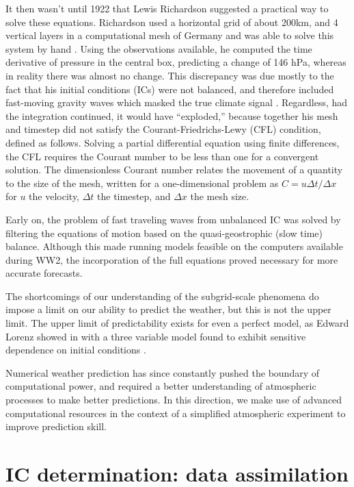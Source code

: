 It then wasn't until 1922 that Lewis Richardson suggested a practical way to solve these equations.
Richardson used a horizontal grid of about 200km, and 4 vertical layers in a computational mesh of Germany and was able to solve this system by hand .
Using the observations available, he computed the time derivative of pressure in the central box, predicting a change of 146 hPa, whereas in reality there was almost no change.
This discrepancy was due mostly to the fact that his initial conditions (ICs) were not balanced, and therefore included fast-moving gravity waves which masked the true climate signal .
Regardless, had the integration continued, it would have ``exploded,'' because together his mesh and timestep did not satisfy the Courant-Friedrichs-Lewy (CFL) condition, defined as follows.
Solving a partial differential equation using finite differences, the CFL requires the Courant number to be less than one for a convergent solution.
The dimensionless Courant number relates the movement of a quantity to the size of the mesh, written for a one-dimensional problem as $C = u \Delta t/\Delta x $ for $u$ the velocity, $\Delta t$ the timestep, and $\Delta x$ the mesh size.

Early on, the problem of fast traveling waves from unbalanced IC was solved by filtering the equations of motion based on the quasi-geostrophic (slow time) balance.
Although this made running models feasible on the computers available during WW2, the incorporation of the full equations proved necessary for more accurate forecasts.

The shortcomings of our understanding of the subgrid-scale phenomena do impose a limit on our ability to predict the weather, but this is not the upper limit.
The upper limit of predictability exists for even a perfect model, as Edward Lorenz showed in with a three variable model found to exhibit sensitive dependence on initial conditions .

Numerical weather prediction has since constantly pushed the boundary of computational power, and required a better understanding of atmospheric processes to make better predictions.
In this direction, we make use of advanced computational resources in the context of a simplified atmospheric experiment to improve prediction skill.

\section{IC determination: data assimilation}

